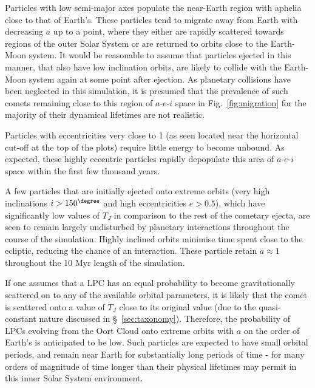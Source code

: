 Particles with low semi-major axes populate the near-Earth region with aphelia close to that of Earth's. These particles tend to migrate away from Earth with decreasing $a$ up to a point, where they either are rapidly scattered towards regions of the outer Solar System or are returned to orbits close to the Earth-Moon system. It would be reasonable to assume that particles ejected in this manner, that also have low inclination orbits, are likely to collide with the Earth-Moon system again at some point after ejection. As planetary collisions have been neglected in this simulation, it is presumed that the prevalence of such comets remaining close to this region of $a$-$e$-$i$ space in Fig.~\ref{fig:migration} for the majority of their dynamical lifetimes are not realistic.

Particles with eccentricities very close to 1 (as seen located near the horizontal cut-off at the top of the plots) require little energy to become unbound. As expected, these highly eccentric particles rapidly depopulate this area of $a$-$e$-$i$ space within the first few thousand years.

A few particles that are initially ejected onto extreme orbits (very high inclinations $i > 150^\degree$ and high eccentricities $e>0.5$), which have significantly low values of $T_J$ in comparison to the rest of the cometary ejecta, are seen to remain largely undisturbed by planetary interactions throughout the course of the simulation.  Highly inclined orbits minimise time spent close to the ecliptic, reducing the chance of an interaction. These particle retain $a \approx 1$ throughout the 10 Myr length of the simulation.

If one assumes that a LPC has an equal probability to become gravitationally scattered on to any of the available orbital parameters, it is likely that the comet is scattered onto a value of $T_J$ close to its original value (due to the quasi-constant nature discussed in \S~\ref{sec:taxonomy}). Therefore, the probability of LPCs evolving from the Oort Cloud onto extreme orbits with $a$ on the order of Earth's is anticipated to be low. Such particles are expected to have small orbital periods, and remain near Earth for substantially long periods of time - for many orders of magnitude of time longer than their physical lifetimes may permit in this inner Solar System environment.


